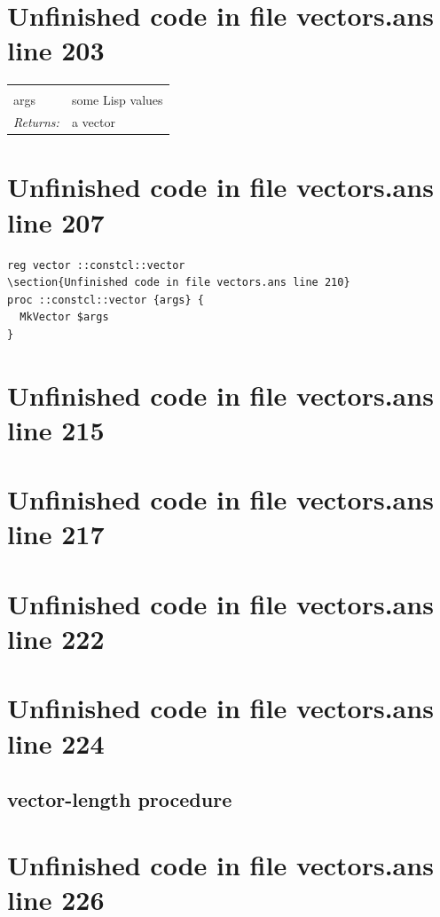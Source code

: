 \documentclass[twoside,9pt]{report}
\begin{document}
\section{Unfinished code in file vectors.ans line 203}
\noindent\begin{tabular}{ |p{1.9cm} p{8cm}| }
\hline
\rowcolor[HTML]{CCCCCC} \multicolumn{2}{|l|}{\bf vector (public)} \\
args & some Lisp values \\
\textit{Returns:} & a vector \\
\hline
\end{tabular}
\section{Unfinished code in file vectors.ans line 207}
\begin{lstlisting}
reg vector ::constcl::vector
\section{Unfinished code in file vectors.ans line 210}
proc ::constcl::vector {args} {
  MkVector $args
}
\end{lstlisting}
\section{Unfinished code in file vectors.ans line 215}
\section{Unfinished code in file vectors.ans line 217}
\section{Unfinished code in file vectors.ans line 222}
\section{Unfinished code in file vectors.ans line 224}
\subsection{vector-length procedure}
\label{vector-length-procedure}
\section{Unfinished code in file vectors.ans line 226}
\end{document}
